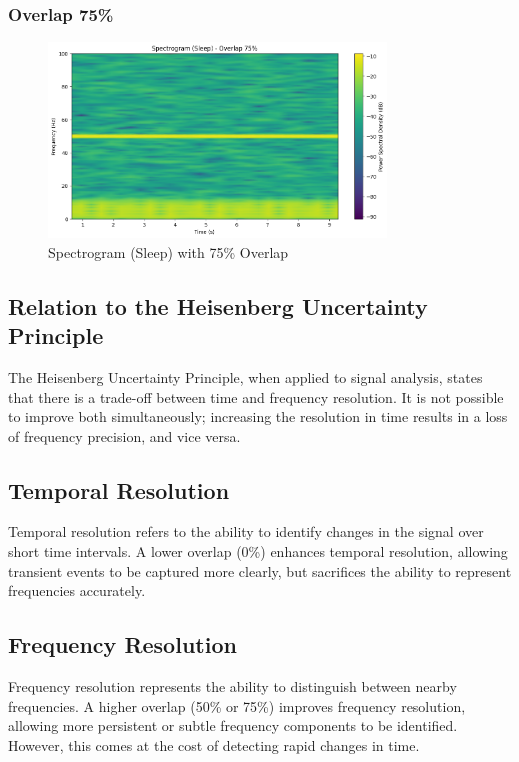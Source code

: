 \documentclass[10pt]{article}
\theoremstyle{definition}
\theoremstyle{remark}
\theoremstyle{definition}
\numberwithin{equation}{prob}
\begin{document}
\subsubsection{Overlap 75\%}

\begin{figure}[H]
    \centering
    \includegraphics[width=0.8\textwidth]{./figures/Spectrogram (Sleep) - Overlap 75.png}
    \caption{Spectrogram (Sleep) with 75\% Overlap}
    \label{fig:sleep_75_overlap}
\end{figure}

\subsection{Relation to the Heisenberg Uncertainty Principle}

The Heisenberg Uncertainty Principle, when applied to signal analysis, states that there is a trade-off between time and frequency resolution. It is not possible to improve both simultaneously; increasing the resolution in time results in a loss of frequency precision, and vice versa.

\subsection*{Temporal Resolution}
Temporal resolution refers to the ability to identify changes in the signal over short time intervals. A lower overlap (0\%) enhances temporal resolution, allowing transient events to be captured more clearly, but sacrifices the ability to represent frequencies accurately.

\subsection*{Frequency Resolution}
Frequency resolution represents the ability to distinguish between nearby frequencies. A higher overlap (50\% or 75\%) improves frequency resolution, allowing more persistent or subtle frequency components to be identified. However, this comes at the cost of detecting rapid changes in time.
\end{document}
